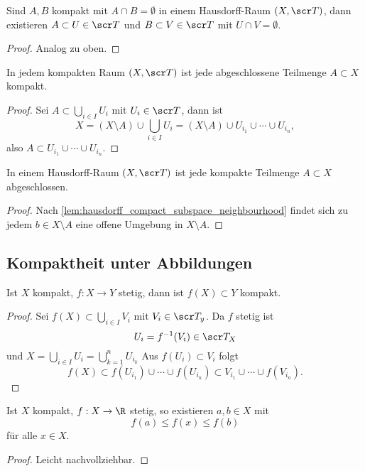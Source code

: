 \begin{st}
	Sind $A, B$ kompakt mit $A \cap B = \emptyset$ in einem Hausdorff-Raum $(X, \scr T)$, dann existieren $A \subset U \in \scr T$ und $B \subset V \in \scr T$ mit $U \cap V = \emptyset$.
	\begin{proof}
		Analog zu oben.
	\end{proof}
\end{st}


\begin{st}
	In jedem kompakten Raum $(X, \scr T)$ ist jede abgeschlossene Teilmenge $A \subset X$ kompakt.
	\begin{proof}
		Sei $A \subset \bigcup_{i\in I} U_i$ mit $U_i \in \scr T$, dann ist
		\[
			X
			= (X \setminus A) \cup \bigcup_{i\in I} U_i
			= (X \setminus A) \cup U_{i_1} \cup \dotsb \cup U_{i_n},
		\]
		also $A \subset U_{i_1} \cup \dotsb \cup U_{i_n}$.
	\end{proof}
\end{st}

\begin{st}
	In einem Hausdorff-Raum $(X, \scr T)$ ist jede kompakte Teilmenge $A \subset X$ abgeschlossen.
	\begin{proof}
		Nach \ref{lem:hausdorff_compact_subspace_neighbourhood} findet sich zu jedem $b \in X \setminus A$ eine offene Umgebung in $X \setminus A$.
	\end{proof}
\end{st}

\subsection{Kompaktheit unter Abbildungen}

\begin{st}
	Ist $X$ kompakt, $f: X \to Y$ stetig, dann ist $f(X) \subset Y$ kompakt.
	\begin{proof}
		Sei $f(X) \subset \bigcup_{i\in I} V_i$ mit $V_i \in \scr T_y$.
		Da $f$ stetig ist
		\[
			U_i = f^{-1}(V_i) \in \scr T_X
		\]
		und $X = \bigcup_{i\in I} U_i = \bigcup_{k=1}^n U_{i_k}$
		Aus $f(U_i) \subset V_i$ folgt
		\[
			f(X)
			\subset f(U_{i_1}) \cup \dotsb \cup f(U_{i_n})
			\subset V_{i_1} \cup \dotsb \cup f(V_{i_n}).
		\]
	\end{proof}
\end{st}

\begin{st}
	Ist $X$ kompakt, $f: X \to \R$ stetig, so existieren $a, b \in X$ mit
	\[
		f(a) \le f(x) \le f(b)
	\]
	für alle $x \in X$.
	\begin{proof}
		Leicht nachvollziehbar.
	\end{proof}
\end{st}

